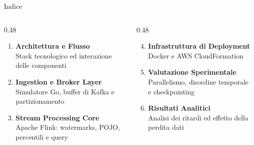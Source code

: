 \documentclass[10pt, aspectratio=169]{beamer}
\begin{document}
\begin{frame}{Indice}
    \vspace{-0.3cm}
    \begin{columns}[T]
        \begin{column}{0.48\textwidth}
            \begin{enumerate}
                \item \textbf{Architettura e Flusso}
                \\{\scriptsize Stack tecnologico ed interazione delle componenti}
                \vspace{0.35cm}

                \item \textbf{Ingestion e Broker Layer}
                \\{\scriptsize Simulatore Go, buffer di Kafka e partizionamento}
                \vspace{0.35cm}

                \item \textbf{Stream Processing Core}
                \\{\scriptsize Apache Flink: watermarks, POJO, percentili e query}
            \end{enumerate}
        \end{column}

        \begin{column}{0.48\textwidth}
            \begin{enumerate}\setcounter{enumi}{3}
                \item \textbf{Infrastruttura di Deployment}
                \\{\scriptsize Docker e AWS CloudFormation}
                \vspace{0.35cm}

                \item \textbf{Valutazione Sperimentale}
                \\{\scriptsize Parallelismo, disordine temporale e checkpointing}
                \vspace{0.35cm}

                \item \textbf{Risultati Analitici}
                \\{\scriptsize Analisi dei ritardi ed effetto della perdita dati}
            \end{enumerate}
        \end{column}
    \end{columns}
\end{frame}
\end{document}
